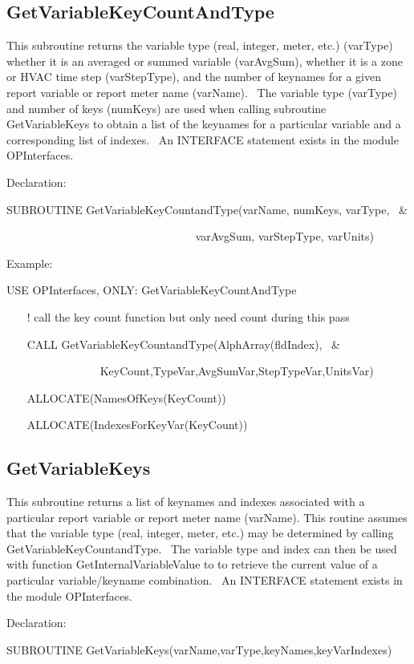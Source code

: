 \subsection{GetVariableKeyCountAndType}\label{getvariablekeycountandtype}

This subroutine returns the variable type (real, integer, meter, etc.) (varType) whether it is an averaged or summed variable (varAvgSum), whether it is a zone or HVAC time step (varStepType), and the number of keynames for a given report variable or report meter name (varName).~ The variable type (varType) and number of keys (numKeys) are used when calling subroutine GetVariableKeys to obtain a list of the keynames for a particular variable and a corresponding list of indexes.~ An INTERFACE statement exists in the module OPInterfaces.

Declaration:

SUBROUTINE GetVariableKeyCountandType(varName, numKeys, varType,~ \&

~~~~~~~~~~~~~~~~~~~~~~~~~~~~~~~~~ varAvgSum, varStepType, varUnits)

Example:

USE OPInterfaces, ONLY: GetVariableKeyCountAndType

~~~ ! call the key count function but only need count during this pass

~~~ CALL GetVariableKeyCountandType(AlphArray(fldIndex),~ \&

~~~~~~~~~~~~~~~~ KeyCount,TypeVar,AvgSumVar,StepTypeVar,UnitsVar)

~~~ ALLOCATE(NamesOfKeys(KeyCount))

~~~ ALLOCATE(IndexesForKeyVar(KeyCount))

\subsection{GetVariableKeys}\label{getvariablekeys}

This subroutine returns a list of keynames and indexes associated with a particular report variable or report meter name (varName). This routine assumes that the variable type (real, integer, meter, etc.) may be determined by calling GetVariableKeyCountandType.~ The variable type and index can then be used with function GetInternalVariableValue to to retrieve the current value of a particular variable/keyname combination. ~An INTERFACE statement exists in the module OPInterfaces.

Declaration:

SUBROUTINE GetVariableKeys(varName,varType,keyNames,keyVarIndexes)

